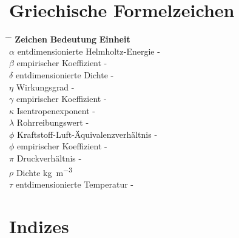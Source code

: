 \section*{Griechische Formelzeichen}

\begin{tabbing}
	\hspace*{3cm} \= \hspace*{8cm} \= \hspace*{2cm}\kill
	\textbf{Zeichen} \> \textbf{Bedeutung} 				\>	\textbf{Einheit}		\\[5mm]
	$\alpha$    \>  entdimensionierte Helmholtz-Energie \>  -  \\
    $\beta$     \>  empirischer Koeffizient             \>  -  \\
    $\delta$    \>  entdimensionierte Dichte            \>  -  \\
    $\eta$		\>	Wirkungsgrad						\>	-  \\
    $\gamma$    \>  empirischer Koeffizient             \>  -  \\
	$\kappa$	\>	Isentropenexponent					\>	-  \\
    $\lambda$   \>  Rohrreibungswert                    \>  -  \\
    $\phi$      \>  Kraftstoff-Luft-Äquivalenzverhältnis \> -  \\
    $\phi$      \>  empirischer Koeffizient             \>  -  \\
	$\pi$		\>	Druckverhältnis						\>	-  \\
	$\rho$	    \>	Dichte								\>     \si{\kg\per\cubic\m}	\\
    $\tau$      \>  entdimensionierte Temperatur        \>  -  \\
\end{tabbing}

\section*{Indizes}

